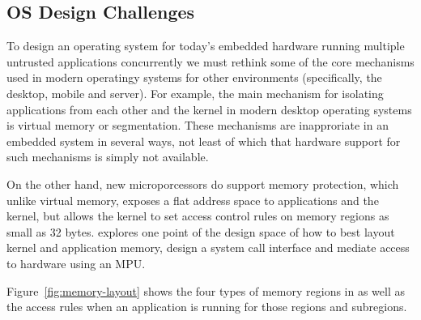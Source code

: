 % 

\subsection{OS Design Challenges}

To design an operating system for today's embedded hardware running multiple
untrusted applications concurrently we must rethink some of the core mechanisms
used in modern operatingy systems for other environments (specifically, the
desktop, mobile and server). For example, the main mechanism for isolating
applications from each other and the kernel in modern desktop operating systems
is virtual memory or segmentation. These mechanisms are inapproriate in an
embedded system in several ways, not least of which that hardware support for
such mechanisms is simply not available.

On the other hand, new microporcessors do support memory protection, which
unlike virtual memory, exposes a flat address space to applications and the
kernel, but allows the kernel to set access control rules on memory regions as
small as 32 bytes. \name explores one point of the design space of how to best
layout kernel and application memory, design a system call interface and mediate
access to hardware using an MPU.

Figure~\ref{fig:memory-layout} shows the four types of memory regions in \name
as well as the access rules when an application is running for those regions and
subregions.

